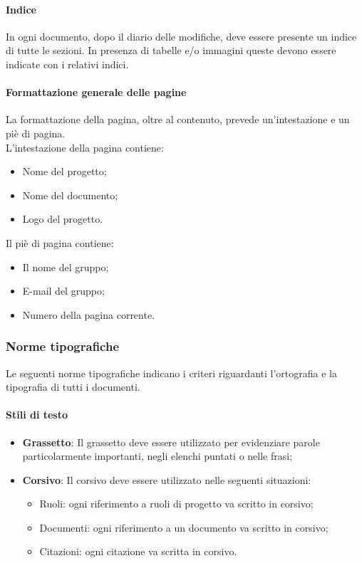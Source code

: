 \paragraph{Indice}
In ogni documento, dopo il diario delle modifiche, deve essere presente un 
indice di tutte le sezioni. In presenza di tabelle e/o immagini queste devono 
essere indicate con i relativi indici.

\paragraph{Formattazione generale delle pagine}
La formattazione della pagina, oltre al contenuto, prevede un'intestazione e un 
piè di pagina. \\
L'intestazione della pagina contiene:
\begin{itemize}
  \item Nome del progetto;
  \item Nome del documento;
  \item Logo del progetto.
\end{itemize}
Il piè di pagina contiene:
\begin{itemize}
  \item Il nome del gruppo;
  \item E-mail del gruppo;
  \item Numero della pagina corrente.
\end{itemize}

\subsubsection{Norme tipografiche}
Le seguenti norme tipografiche indicano i criteri riguardanti 
l'ortografia e la tipografia di tutti i documenti. 
\paragraph{Stili di testo}
\begin{itemize}
  \item \textbf{Grassetto}: Il grassetto deve essere utilizzato per evidenziare parole 
  particolarmente importanti, negli elenchi puntati o nelle frasi;
  \item \textbf{Corsivo}: Il corsivo deve essere utilizzato nelle seguenti 
  situazioni:
  \begin{itemize}
    \item Ruoli: ogni riferimento a ruoli di progetto va scritto in corsivo;
    \item Documenti: ogni riferimento a un documento va scritto in corsivo;
    \item Citazioni: ogni citazione va scritta in corsivo.
  \end{itemize}
\end{itemize}
